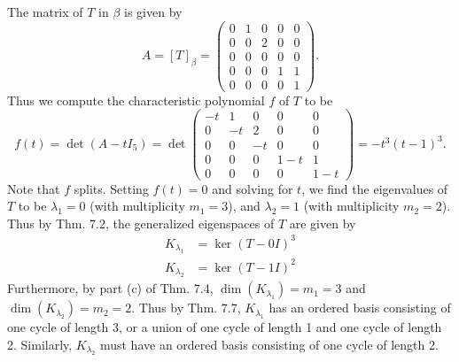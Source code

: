 \documentclass[12pt]{article}
\begin{document}
\begin{enumerate}
\begin{enumerate}
The matrix of $T$ in $\beta$ is given by
\begin{equation*}
A = [T]_\beta = \begin{pmatrix}
0 & 1 & 0 & 0 & 0 \\
0 & 0 & 2 & 0 & 0 \\
0 & 0 & 0 & 0 & 0 \\
0 & 0 & 0 & 1 & 1 \\
0 & 0 & 0 & 0 & 1
\end{pmatrix}.
\end{equation*}
Thus we compute the characteristic polynomial $f$ of $T$ to be
\begin{equation*}
f(t) = \det(A - tI_5) = \det\begin{pmatrix}
-t & 1 & 0 & 0 & 0 \\
0 & -t & 2 & 0 & 0 \\
0 & 0 & -t & 0 & 0 \\
0 & 0 & 0 & 1-t & 1 \\
0 & 0 & 0 & 0 & 1-t
\end{pmatrix} = -t^3(t-1)^3.
\end{equation*}
Note that $f$ splits. Setting $f(t) = 0$ and solving for $t$, we find the eigenvalues of $T$ to be $\lambda_1 = 0$ (with multiplicity $m_1 = 3$), and $\lambda_2 = 1$ (with multiplicity $m_2 = 2$). Thus by Thm. 7.2, the generalized eigenspaces of $T$ are given by
\begin{align*}
K_{\lambda_1} &= \ker(T-0I)^3 \\
K_{\lambda_2} &= \ker(T-1I)^2
\end{align*}
Furthermore, by part (c) of Thm. 7.4, $\dim(K_{\lambda_1}) = m_1 = 3$ and $\dim(K_{\lambda_2}) = m_2 = 2$. Thus by Thm. 7.7, $K_{\lambda_1}$ has an ordered basis consisting of one cycle of length 3, or a union of one cycle of length 1 and one cycle of length 2. Similarly, $K_{\lambda_2}$ must have an ordered basis consisting of one cycle of length 2.


\end{enumerate}
\end{enumerate}
\end{document}
